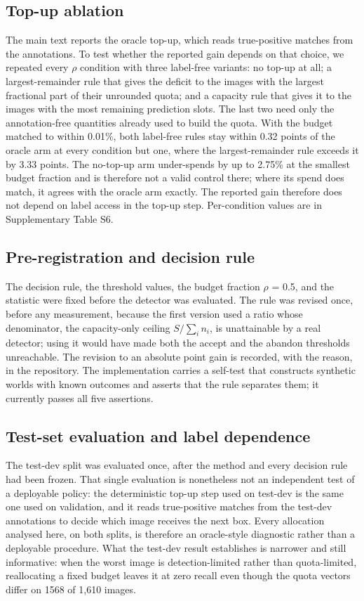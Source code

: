 \documentclass[sn-mathphys,Numbered]{sn-jnl}
\begin{document}
\subsection{Top-up ablation}

The main text reports the oracle top-up, which reads true-positive matches from the annotations. To test whether the reported gain depends on that choice, we repeated every $\rho$ condition with three label-free variants: no top-up at all; a largest-remainder rule that gives the deficit to the images with the largest fractional part of their unrounded quota; and a capacity rule that gives it to the images with the most remaining prediction slots. The last two need only the annotation-free quantities already used to build the quota. With the budget matched to within 0.01\%, both label-free rules stay within 0.32 points of the oracle arm at every condition but one, where the largest-remainder rule exceeds it by 3.33 points. The no-top-up arm under-spends by up to 2.75\% at the smallest budget fraction and is therefore not a valid control there; where its spend does match, it agrees with the oracle arm exactly. The reported gain therefore does not depend on label access in the top-up step. Per-condition values are in Supplementary Table S6.

\subsection{Pre-registration and decision rule}

The decision rule, the threshold values, the budget fraction $\rho$ = 0.5, and the statistic were fixed before the detector was evaluated. The rule was revised once, before any measurement, because the first version used a ratio whose denominator, the capacity-only ceiling $S/\sum_i n_i$, is unattainable by a real detector; using it would have made both the accept and the abandon thresholds unreachable. The revision to an absolute point gain is recorded, with the reason, in the repository. The implementation carries a self-test that constructs synthetic worlds with known outcomes and asserts that the rule separates them; it currently passes all five assertions.

\subsection{Test-set evaluation and label dependence}

The test-dev split was evaluated once, after the method and every decision rule had been frozen. That single evaluation is nonetheless not an independent test of a deployable policy: the deterministic top-up step used on test-dev is the same one used on validation, and it reads true-positive matches from the test-dev annotations to decide which image receives the next box. Every allocation analysed here, on both splits, is therefore an oracle-style diagnostic rather than a deployable procedure. What the test-dev result establishes is narrower and still informative: when the worst image is detection-limited rather than quota-limited, reallocating a fixed budget leaves it at zero recall even though the quota vectors differ on 1568 of 1,610 images.
\end{document}
